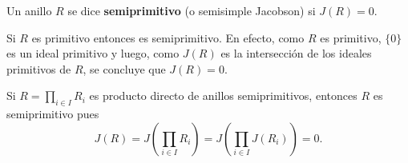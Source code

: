 






\begin{definition}
	Un anillo $R$ se dice \textbf{semiprimitivo} (o semisimple Jacobson) si
	$J(R)=0$.
\end{definition}

\begin{example}
	Si $R$ es primitivo entonces es semiprimitivo. En efecto, como $R$ es
	primitivo, $\{0\}$ es un ideal primitivo y luego, como $J(R)$ es la
	intersección de los ideales primitivos de $R$, se concluye que $J(R)=0$.
\end{example}

\begin{example}
	Si $R=\prod_{i\in I}R_i$ es producto directo de anillos semiprimitivos,
	entonces $R$ es semiprimitivo pues 
	\[
		J(R)=J\left(\prod_{i\in I}R_i\right)=J\left(\prod_{i\in I}J(R_i)\right)=0.
	\]
\end{example}

